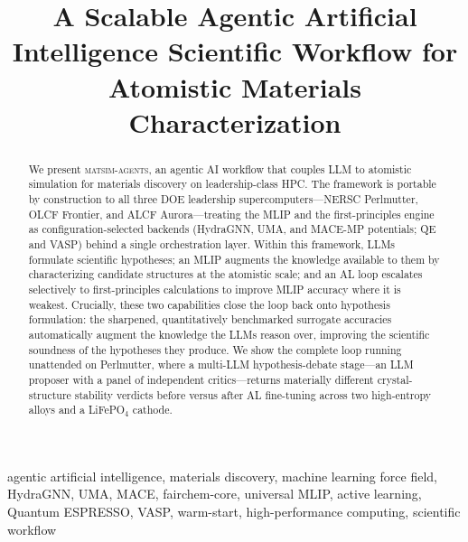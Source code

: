 \documentclass[conference]{IEEEtran}
\def\ac#1{#1}%
\def\acs#1{#1}%
\def\acp#1{#1}%
\begin{document}
\title{A Scalable Agentic Artificial Intelligence Scientific Workflow for
Atomistic Materials Characterization}

\author{
}

\maketitle

\begin{abstract}
We present \textsc{matsim-agents}, an agentic \ac{AI} workflow that couples
\acp{LLM} to atomistic simulation for materials discovery on leadership-class
\ac{HPC}. The framework is portable by construction to all three \ac{DOE}
leadership supercomputers---\ac{NERSC} Perlmutter, \ac{OLCF} Frontier, and
\ac{ALCF} Aurora---treating the \ac{MLIP} and the first-principles engine as
configuration-selected backends (HydraGNN, UMA, and MACE-MP potentials; \ac{QE}
and \ac{VASP}) behind a single orchestration layer. Within this framework,
\acsp{LLM} formulate scientific hypotheses; an \ac{MLIP} augments the knowledge
available to them by characterizing candidate structures at the atomistic scale;
and an \ac{AL} loop escalates selectively to first-principles
calculations to improve \acs{MLIP} accuracy where it is weakest. Crucially, these
two capabilities close the loop back onto hypothesis formulation: the sharpened,
quantitatively benchmarked surrogate accuracies automatically augment the knowledge
the \acsp{LLM} reason over, improving the scientific soundness of the hypotheses
they produce. We show the complete loop running unattended on Perlmutter,
where a multi-\acs{LLM} hypothesis-debate stage---an \acs{LLM} proposer with a
panel of independent critics---returns materially different crystal-structure
stability verdicts before versus after \acs{AL} fine-tuning across two
high-entropy alloys and a LiFePO$_4$ cathode.
\end{abstract}

\begin{IEEEkeywords}
agentic artificial intelligence, materials discovery, machine learning force field, HydraGNN,
UMA, MACE, fairchem-core, universal MLIP,
active learning, Quantum ESPRESSO, VASP,
warm-start, high-performance computing, scientific workflow
\end{IEEEkeywords}
\end{document}
